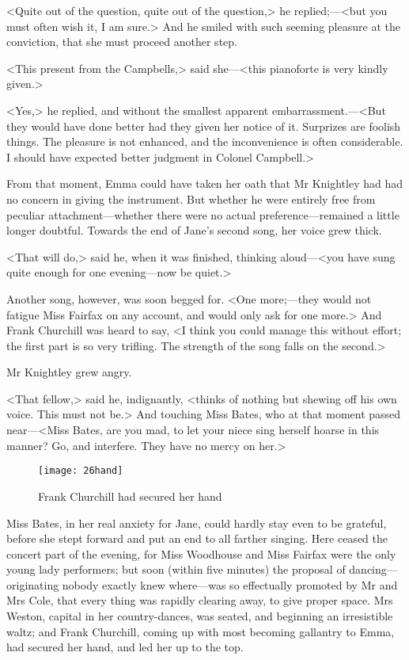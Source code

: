 <Quite out of the question, quite out of the question,> he replied;—<but you must often wish it, I am sure.> And he smiled with such seeming pleasure at the conviction, that she must proceed another step.

<This present from the Campbells,> said she—<this pianoforte is very kindly given.>

<Yes,> he replied, and without the smallest apparent embarrassment.—<But they would have done better had they given her notice of it. Surprizes are foolish things. The pleasure is not enhanced, and the inconvenience is often considerable. I should have expected better judgment in Colonel Campbell.>

From that moment, Emma could have taken her oath that Mr Knightley had had no concern in giving the instrument. But whether he were entirely free from peculiar attachment—whether there were no actual preference—remained a little longer doubtful. Towards the end of Jane's second song, her voice grew thick.

<That will do,> said he, when it was finished, thinking aloud—<you have sung quite enough for one evening—now be quiet.>

Another song, however, was soon begged for. <One more;—they would not fatigue Miss Fairfax on any account, and would only ask for one more.> And Frank Churchill was heard to say, <I think you could manage this without effort; the first part is so very trifling. The strength of the song falls on the second.>

Mr Knightley grew angry.

<That fellow,> said he, indignantly, <thinks of nothing but shewing off his own voice. This must not be.> And touching Miss Bates, who at that moment passed near—<Miss Bates, are you mad, to let your niece sing herself hoarse in this manner? Go, and interfere. They have no mercy on her.>

\begin{figure}[tbph]
\centering
\texttt{[image: 26hand]}
\caption{Frank Churchill had secured her hand}
\end{figure}

Miss Bates, in her real anxiety for Jane, could hardly stay even to be grateful, before she stept forward and put an end to all farther singing. Here ceased the concert part of the evening, for Miss Woodhouse and Miss Fairfax were the only young lady performers; but soon (within five minutes) the proposal of dancing—originating nobody exactly knew where—was so effectually promoted by Mr and Mrs Cole, that every thing was rapidly clearing away, to give proper space. Mrs Weston, capital in her country-dances, was seated, and beginning an irresistible waltz; and Frank Churchill, coming up with most becoming gallantry to Emma, had secured her hand, and led her up to the top.

